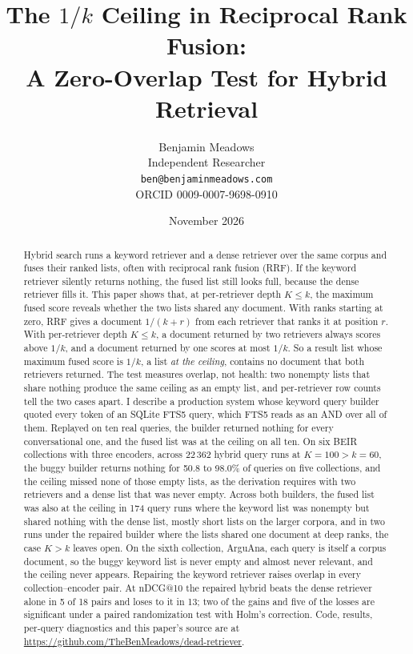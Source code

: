 \documentclass[11pt]{article}
\title{The $1/k$ Ceiling in Reciprocal Rank Fusion:\\A Zero-Overlap Test for Hybrid Retrieval}
\author{Benjamin Meadows\\Independent Researcher\\\texttt{ben@benjaminmeadows.com}\\ORCID 0009-0007-9698-0910}
\date{November 2026}
\begin{document}
\maketitle

\begin{abstract}
Hybrid search runs a keyword retriever and a dense retriever over the same corpus and fuses their ranked lists, often with reciprocal rank fusion (RRF). If the keyword retriever silently returns nothing, the fused list still looks full, because the dense retriever fills it. This paper shows that, at per-retriever depth $K \le k$, the maximum fused score reveals whether the two lists shared any document. With ranks starting at zero, RRF gives a document $1/(k+r)$ from each retriever that ranks it at position $r$. With per-retriever depth $K \le k$, a document returned by two retrievers always scores above $1/k$, and a document returned by one scores at most $1/k$. So a result list whose maximum fused score is $1/k$, a list \emph{at the ceiling}, contains no document that both retrievers returned. The test measures overlap, not health: two nonempty lists that share nothing produce the same ceiling as an empty list, and per-retriever row counts tell the two cases apart. I describe a production system whose keyword query builder quoted every token of an SQLite FTS5 query, which FTS5 reads as an AND over all of them. Replayed on ten real queries, the builder returned nothing for every conversational one, and the fused list was at the ceiling on all ten. On six BEIR collections with three encoders, across 22\,362 hybrid query runs at $K = 100 > k = 60$, the buggy builder returns nothing for 50.8 to 98.0\% of queries on five collections, and the ceiling missed none of those empty lists, as the derivation requires with two retrievers and a dense list that was never empty. Across both builders, the fused list was also at the ceiling in 174 query runs where the keyword list was nonempty but shared nothing with the dense list, mostly short lists on the larger corpora, and in two runs under the repaired builder where the lists shared one document at deep ranks, the case $K > k$ leaves open. On the sixth collection, ArguAna, each query is itself a corpus document, so the buggy keyword list is never empty and almost never relevant, and the ceiling never appears. Repairing the keyword retriever raises overlap in every collection--encoder pair. At nDCG@10 the repaired hybrid beats the dense retriever alone in 5 of 18 pairs and loses to it in 13; two of the gains and five of the losses are significant under a paired randomization test with Holm's correction. Code, results, per-query diagnostics and this paper's source are at \url{https://github.com/TheBenMeadows/dead-retriever}.
\end{abstract}
\end{document}
